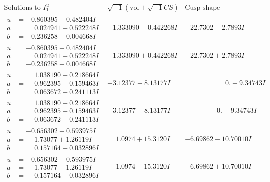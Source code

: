 \documentclass[1p]{elsarticle_modified}
\theoremstyle{definition}
\newcommand{\I}{\sqrt{-1}}
\begin{document}
$$\begin{array}{c|c|c}  
\text{Solutions to }I^u_{1}& \I (\text{vol} + \sqrt{-1}CS) & \text{Cusp shape}\\
 \hline 
\begin{aligned}
u &= -0.860395 + 0.482404 I \\
a &= \phantom{-}0.024941 + 0.522248 I \\
b &= -0.236258 + 0.004668 I\end{aligned}
 & -1.333090 - 0.442268 I & -22.7302 - 2.7893 I \\ \hline\begin{aligned}
u &= -0.860395 - 0.482404 I \\
a &= \phantom{-}0.024941 - 0.522248 I \\
b &= -0.236258 - 0.004668 I\end{aligned}
 & -1.333090 + 0.442268 I & -22.7302 + 2.7893 I \\ \hline\begin{aligned}
u &= \phantom{-}1.038190 + 0.218664 I \\
a &= \phantom{-}0.962395 + 0.159463 I \\
b &= \phantom{-}0.063672 - 0.241113 I\end{aligned}
 & -3.12377 - 8.13177 I & \phantom{-0.000000 -}0. + 9.34743 I \\ \hline\begin{aligned}
u &= \phantom{-}1.038190 - 0.218664 I \\
a &= \phantom{-}0.962395 - 0.159463 I \\
b &= \phantom{-}0.063672 + 0.241113 I\end{aligned}
 & -3.12377 + 8.13177 I & \phantom{-0.000000 } 0. - 9.34743 I \\ \hline\begin{aligned}
u &= -0.656302 + 0.593975 I \\
a &= \phantom{-}1.73077 + 1.26119 I \\
b &= \phantom{-}0.157164 + 0.032896 I\end{aligned}
 & \phantom{-}1.0974 + 15.3120 I & -6.69862 - 10.70010 I \\ \hline\begin{aligned}
u &= -0.656302 - 0.593975 I \\
a &= \phantom{-}1.73077 - 1.26119 I \\
b &= \phantom{-}0.157164 - 0.032896 I\end{aligned}
 & \phantom{-}1.0974 - 15.3120 I & -6.69862 + 10.70010 I \\ \hline\begin{aligned}

\end{aligned}
\end{array}$$
\end{document}
